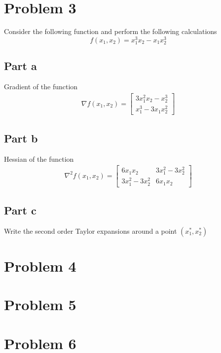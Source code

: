 \documentclass[11pt]{article}
\begin{document}
\section{Problem 3}
Consider the following function and perform the following calculations
\begin{equation*}
    f(x_1, x_2) = x_1^3 x_2 - x_1 x_2^3
\end{equation*}

\subsection{Part a}
Gradient of the function
\begin{align*}
    \nabla f(x_1, x_2) = 
  \begin{bmatrix}
     3x_1^2 x_2 - x_2^3 \\
     x_1^3 - 3x_1 x_2^2
  \end{bmatrix}
\end{align*}

\subsection{Part b}
Hessian of the function
\begin{align*}
    \nabla^2 f(x_1, x_2) = 
  \begin{bmatrix}
     6x_1 x_2 & 3x_1^2 - 3x_2^2 \\
     3x_1^2 - 3x_2^2 &  6 x_1 x_2
  \end{bmatrix}
\end{align*}

\subsection{Part c}
Write the second order Taylor expansions around a point $(x_1^*, x_2^*)$

\section{Problem 4}

\section{Problem 5}

\section{Problem 6}
\end{document}

